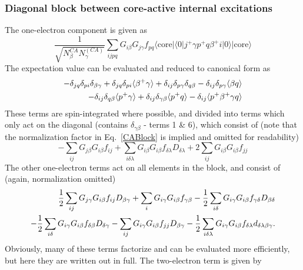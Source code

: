\documentclass[a4paper,oneside,11pt]{article}
\numberwithin{equation}{section}
\newcommand{\DMETBra}{\langle \mathrm{core}|\langle 0|}
\newcommand{\DMETKet}{|0\rangle| \mathrm{core} \rangle}
\begin{document}
\subsubsection{Diagonal block between core-active internal excitations}
The one-electron component is given as 
\begin{equation}
\frac{1}{\sqrt{N^{CA}_{\beta} N^{(CA)}_{\gamma}}} \sum_{ijpq} G_{i \beta} G_{j \gamma} f_{pq} \DMETBra j^{+} \gamma p^{+} q \beta^{+} i \DMETKet     \label{CABlock}
\end{equation}
The expectation value can be evaluated and reduced to canonical form as
\begin{eqnarray}
-\delta_{jq}\delta_{pi}\delta_{\beta \gamma} + \delta_{jq}\delta_{pi}\langle \beta^{+} \gamma \rangle + \delta_{ij} \delta_{p \gamma} \delta_{q \beta} - \delta_{ij} \delta_{p \gamma} \langle \beta q \rangle \\ \notag
- \delta_{ij} \delta_{q \beta} \langle p^{+} \gamma \rangle + \delta_{ij} \delta_{\gamma \beta} \langle p^{+} q \rangle - \delta_{ij} \langle p^{+} \beta^{+} \gamma q \rangle
\end{eqnarray}
These terms are spin-integrated where possible, and divided into terms which only act on the diagonal (contains $\delta_{\gamma \beta}$ - terms 1 \& 6), 
which consist of (note that the normalization factor in Eq.~\ref{CABlock} is implied and omitted for readability)
\begin{equation}
-\sum_{ij} G_{j \beta} G_{i \beta} f_{ij} + \sum_{i \delta \lambda} G_{i \beta} G_{i \beta} f_{\delta \lambda} D_{\delta \lambda} + 2 \sum_{ij} G_{i \beta} G_{i \beta} f_{jj}
\end{equation}
The other one-electron terms act on all elements in the block, and consist of (again, normalization omitted)
\begin{eqnarray}
\frac{1}{2} \sum_{ij} G_{j \gamma} G_{i \beta} f_{ij} D_{\beta \gamma} + \sum_{i} G_{i \gamma} G_{i \beta} f_{\gamma \beta} - \frac{1}{2} \sum_{i \delta} G_{i \gamma} G_{i \beta} f_{\gamma \delta} D_{\beta \delta}  \notag \\ 
- \frac{1}{2} \sum_{i \delta} G_{i \gamma} G_{i \beta} f_{\delta \beta} D_{\delta \gamma} - \sum_{ij} G_{i \gamma} G_{i \beta} f_{jj} D_{\beta \gamma} - \frac{1}{2} \sum_{i \delta \lambda} G_{i \gamma} G_{i \beta} f_{\delta \lambda} d_{\delta \lambda \beta \gamma} .
\end{eqnarray}
Obviously, many of these terms factorize and can be evaluated more efficiently, but here they are written out in full.
The two-electron term is given by
\end{document}
